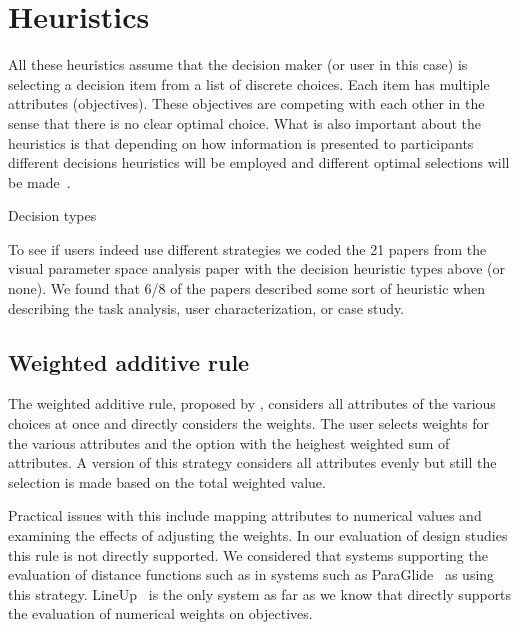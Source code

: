 
\section{Heuristics}\label{heuristics}

All these heuristics assume that the decision maker (or user in this case)
is selecting a decision item from a list of discrete choices. Each item
has multiple attributes (objectives). These objectives are competing with
each other in the sense that there is no clear optimal choice. What is also
important about the heuristics is that depending on how information is 
presented to participants different decisions heuristics will be employed
and different optimal selections will be made~.

\begin{table*}[tb]
  \begin{center}
    \caption{Decision types}
  \end{center}
\end{table*}

To see if users indeed use different strategies we coded the 21 papers
from the visual parameter space analysis paper \citep{Sedlmair:2014}
with the decision heuristic types above (or none). We found that 6/8 of
the papers described some sort of heuristic when describing the task
analysis, user characterization, or case study.


\subsection{Weighted additive rule}\label{weighted-additive-rule}

The weighted additive rule, proposed by , considers all
attributes of the various choices at once and directly considers 
the weights. The user selects weights for the various attributes and 
the option with the heighest weighted sum of attributes.
A version of this strategy considers all attributes evenly but still
the selection is made based on the total weighted value.

Practical issues with this include mapping attributes to numerical values
and examining the effects of adjusting the weights. In our evaluation of
design studies this rule is not directly supported. We considered that
systems supporting the evaluation of distance functions such as 
in systems such as ParaGlide~\citep{Bergner:2013} as using this strategy.
LineUp~\citep{Gratzl:2013} is the only system as far as we know that
directly supports the evaluation of numerical weights on objectives.

